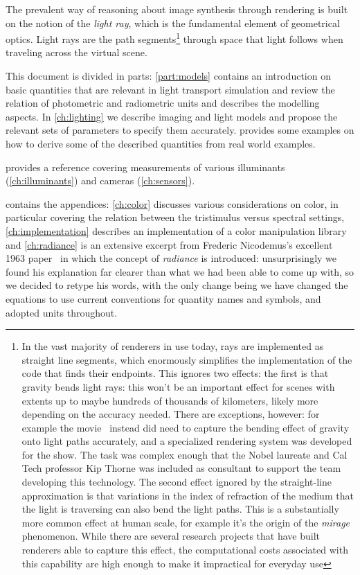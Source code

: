 The prevalent way of reasoning about image synthesis through rendering is 
built on the notion of the \textsl{light ray}, which is the fundamental element 
of geometrical optics. 
Light rays are the path segments\footnote{
	In the vast majority of renderers in use today, rays are implemented as 
	straight line segments, which enormously simplifies the implementation of the
	code that finds their endpoints. This ignores two effects: the first is that 
	gravity bends light rays: this won't be an important effect for scenes with 
	extents up to maybe hundreds of thousands of kilometers, likely more depending
	on the accuracy needed. 
	There are exceptions, however: for example the movie~\cite{interstellar2014} 
	instead did need to capture the bending effect of gravity onto light paths 
	accurately, and a specialized rendering system was developed for the show. 
	The task was complex enough that the Nobel laureate and Cal Tech professor 
	Kip Thorne was included as consultant to support the team developing this 
	technology. 
	The second effect ignored by the straight-line approximation is that 
	variations in the index of refraction of the medium that
	the light is traversing can also bend the light paths. 
	This is a substantially more common effect at human scale, for example 
	it's the origin of the \textsl{mirage} phenomenon. 
	While there are several research projects that have built renderers able 
	to capture this effect, the computational costs associated with this capability 
	are high enough to make it impractical for everyday use
} through space that light follows when traveling across the \gls{virtual scene}. 

This document is divided in parts: \cref{part:models}
contains an introduction on basic quantities that are relevant in
light transport simulation and review the relation of photometric and
radiometric units and describes the modelling aspects. In 
\cref{ch:lighting} we describe imaging and light models and propose the
relevant sets of parameters to specify them accurately.  
 provides some examples on how to derive some of
the described quantities from real world examples.

 provides a reference covering measurements of various 
illuminants (\cref{ch:illuminants}) and cameras (\cref{ch:sensors}).

 contains the appendices: \cref{ch:color} discusses
various considerations on color, in particular covering the relation between 
the tristimulus versus spectral settings,
\cref{ch:implementation} describes an implementation of a color manipulation library
and \cref{ch:radiance} is an extensive excerpt from Frederic Nicodemus's 
excellent 1963 paper~\cite{nicodemus63} in which the concept of \textsl{\gls{radiance}}
is introduced: unsurprisingly we found his explanation far clearer than what we 
had been able to come up with, so we decided to retype his words, with the only change being
we have changed the equations to use current conventions for quantity names and symbols, 
and adopted  units throughout.

